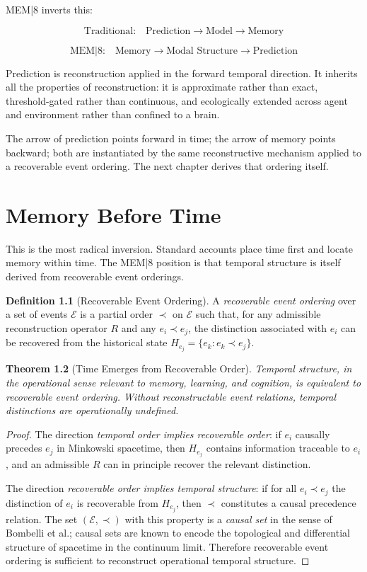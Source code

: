 \documentclass[12pt, oneside]{book}
\theoremstyle{plain}
\newtheorem{theorem}{Theorem}[chapter]
\theoremstyle{definition}
\newtheorem{definition}[theorem]{Definition}
\theoremstyle{remark}
\begin{document}
MEM|8 inverts this:

\[
  \text{Traditional:}\quad
  \text{Prediction} \to \text{Model} \to \text{Memory}
\]

\[
  \text{MEM|8:}\quad
  \text{Memory} \to \text{Modal Structure} \to \text{Prediction}
\]

Prediction is reconstruction applied in the forward
temporal direction.
It inherits all the properties of reconstruction:
it is approximate rather than exact, threshold-gated
rather than continuous, and ecologically extended across
agent and environment rather than confined to a brain.

The arrow of prediction points forward in time;
the arrow of memory points backward; both are
instantiated by the same reconstructive mechanism
applied to a recoverable event ordering.
The next chapter derives that ordering itself.

\chapter{Memory Before Time}

This is the most radical inversion.
Standard accounts place time first and locate memory
within time.
The MEM|8 position is that temporal structure is itself
derived from recoverable event orderings.

\begin{definition}[Recoverable Event Ordering]
A \emph{recoverable event ordering} over a set of events
$\mathcal{E}$ is a partial order $\prec$ on $\mathcal{E}$
such that, for any admissible reconstruction operator $R$
and any $e_i \prec e_j$, the distinction associated with
$e_i$ can be recovered from the historical state
$H_{e_j} = \{e_k : e_k \prec e_j\}$.
\end{definition}

\begin{theorem}[Time Emerges from Recoverable Order]
\label{thm:time}
Temporal structure, in the operational sense relevant to
memory, learning, and cognition, is equivalent to
recoverable event ordering.
Without reconstructable event relations, temporal
distinctions are operationally undefined.
\end{theorem}

\begin{proof}
The direction \emph{temporal order implies recoverable order}:
if $e_i$ causally precedes $e_j$ in Minkowski spacetime,
then $H_{e_j}$ contains information traceable to $e_i$,
and an admissible $R$ can in principle recover the
relevant distinction.

The direction \emph{recoverable order implies temporal structure}:
if for all $e_i \prec e_j$ the distinction of $e_i$ is
recoverable from $H_{e_j}$, then $\prec$ constitutes a
causal precedence relation.
The set $(\mathcal{E}, \prec)$ with this property is a
\emph{causal set} in the sense of Bombelli et al.;
causal sets are known to encode the topological and
differential structure of spacetime in the continuum limit.
Therefore recoverable event ordering is sufficient to
reconstruct operational temporal structure.
\end{proof}
\end{document}

